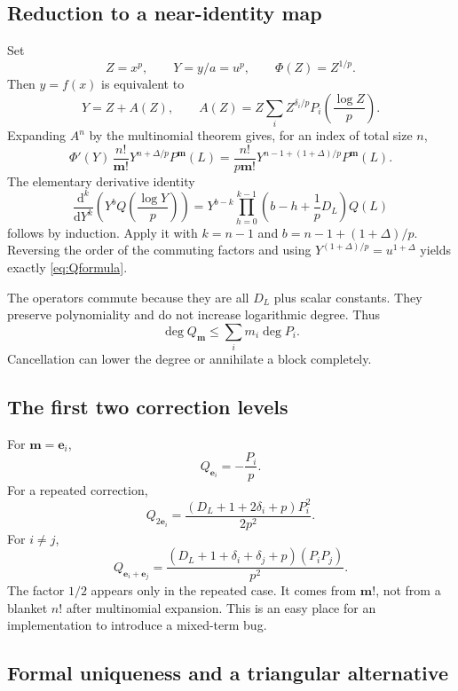 \documentclass[11pt,a4paper]{article}
\numberwithin{equation}{section}
\theoremstyle{definition}
\theoremstyle{remark}
\newcommand{\dd}{\mathrm d}
\begin{document}
\subsection{Reduction to a near-identity map}

Set
\[
 Z=x^p,\qquad Y=y/a=u^p,\qquad \Phi(Z)=Z^{1/p}.
\]
Then $y=f(x)$ is equivalent to
\[
 Y=Z+A(Z),\qquad
 A(Z)=Z\sum_i Z^{\delta_i/p}
 P_i\!\left(\frac{\log Z}{p}\right).
\]
Expanding $A^n$ by the multinomial theorem gives, for an index of total
size $n$,
\[
 \Phi'(Y)\,\frac{n!}{\boldsymbol m!}
 Y^{n+\Delta/p}P^{\boldsymbol m}(L)
 =\frac{n!}{p\boldsymbol m!}
 Y^{n-1+(1+\Delta)/p}P^{\boldsymbol m}(L).
\]
The elementary derivative identity
\begin{equation}\label{eq:derivY}
 \frac{\dd^k}{\dd Y^k}\left(Y^b Q\!\left(\frac{\log Y}{p}\right)\right)
 =Y^{b-k}\prod_{h=0}^{k-1}\left(b-h+\frac1pD_L\right)Q(L)
\end{equation}
follows by induction. Apply it with
$k=n-1$ and $b=n-1+(1+\Delta)/p$. Reversing the order of the commuting
factors and using $Y^{(1+\Delta)/p}=u^{1+\Delta}$ yields exactly
\eqref{eq:Qformula}.

The operators commute because they are all $D_L$ plus scalar constants.
They preserve polynomiality and do not increase logarithmic degree. Thus
\begin{equation}\label{eq:degreebound}
 \deg Q_{\boldsymbol m}\le\sum_i m_i\deg P_i.
\end{equation}
Cancellation can lower the degree or annihilate a block completely.

\subsection{The first two correction levels}

For $\boldsymbol m=\boldsymbol e_i$,
\[
 Q_{\boldsymbol e_i}=-\frac{P_i}{p}.
\]
For a repeated correction,
\[
 Q_{2\boldsymbol e_i}
 =\frac{(D_L+1+2\delta_i+p)P_i^2}{2p^2}.
\]
For $i\ne j$,
\[
 Q_{\boldsymbol e_i+\boldsymbol e_j}
 =\frac{(D_L+1+\delta_i+\delta_j+p)(P_iP_j)}{p^2}.
\]
The factor $1/2$ appears only in the repeated case. It comes from
$\boldsymbol m!$, not from a blanket $n!$ after multinomial expansion.
This is an easy place for an implementation to introduce a mixed-term bug.

\subsection{Formal uniqueness and a triangular alternative}
\end{document}
